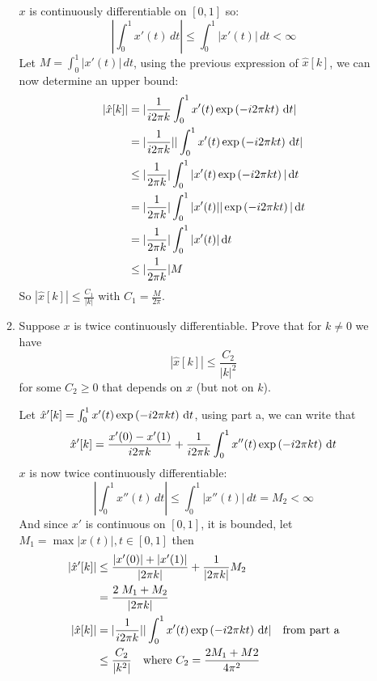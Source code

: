 \documentclass[12pt,twoside]{article}
\begin{document}
\begin{enumerate}
\begin{enumerate}
    $x$ is continuously differentiable on $[0,1]$ so:
     $$\left|\int_0^1 x'(t)\,dt\right| \leq \int_0^1 |x'(t)|\,dt<\infty$$
     Let  $M=\int_0^1 |x'(t)|\,dt$, using the previous expression of $\hat{x}[k] $, we can now determine an upper bound:
     \begin{align*}
	   | \hat{x}[k]| 	&= |\frac{1}{i 2 \pi k} \int_0^1 x'(t) \exp \left( - i2 \pi k t \right)  \, \text{d}t| \\
	   			&= |\frac{1}{i 2 \pi k}| | \int_0^1 x'(t) \exp \left( - i2 \pi k t \right)  \, \text{d}t | \\
				&\le |\frac{1}{2 \pi k}|  \int_0^1 | x'(t) \exp \left( - i2 \pi k t \right)| \, \text{d}t  \\
				&= |\frac{1}{2 \pi k}|  \int_0^1 | x'(t)  |  |\exp \left( - i2 \pi k t \right)| \, \text{d}t  \\
				&=  |\frac{1}{2 \pi k}|  \int_0^1 | x'(t) |  \, \text{d}t  \\
				&\le  |\frac{1}{2 \pi k}| M\\
     \end{align*}
     So  $| \hat{x}[k]| \leq \frac{C_1}{|k|}$ with $C_1 = \frac{M}{2 \pi}$.
	         
  \item Suppose $x$ is twice continuously differentiable.
    Prove that for $k\neq 0$ we have
    $$|\hat{x}[k]| \leq \frac{C_2}{|k|^2}$$
    for some $C_2\geq0$ that depends on $x$ (but not on $k$).
    
    Let $ \hat{x}'[k] =  \int_0^1 x'(t) \exp \left( - i2 \pi k t \right)  \, \text{d}t$, using part a, we can write that
    $$\hat{x}'[k] =  \frac{x'(0) - x'(1)} {i 2 \pi k} + \frac{1}{i 2 \pi k} \int_0^1 x''(t) \exp \left( - i2 \pi k t \right)  \, \text{d}t$$ 
    $x$ is now twice continuously differentiable:
     $$\left|\int_0^1 x''(t)\,dt\right| \leq \int_0^1 |x''(t)|\,dt = M_2<\infty$$
     And since $x'$ is continuous on $[0,1]$, it is bounded, let $M_1 = \max|x(t)|, t \in [0,1]$ then
      \begin{align*}
	   | \hat{x}'[k]| 	&\le \frac{|x'(0) | +  |x'(1) |} {|2 \pi k|} +  \frac{1}{|2 \pi k|} M_2\\
	   			&= \frac{2 \; M_1 + M_2} {|2 \pi k|} \\
	  | \hat{x}[k]| 	&= |\frac{1}{i 2 \pi k}| | \int_0^1 x'(t) \exp \left( - i2 \pi k t \right)  \, \text{d}t| \text{ ~ from part a}\\
	  			&\le \frac{C_2} {|k^2|} \text{ ~ where } C_2 = \frac{2 M_1 + M2} {4 \pi^2}
        \end{align*}
    
  \end{enumerate}
  

\end{enumerate}
\end{document}
